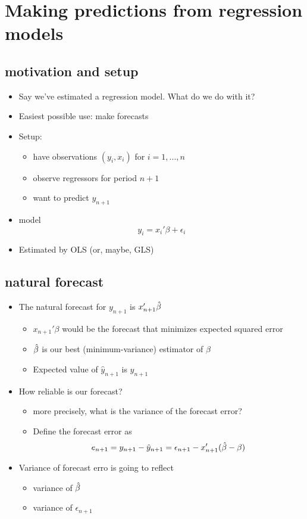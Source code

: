 \section{Making predictions from regression models}

\subsection{motivation and setup}
\begin{itemize}[leftmargin=0pt]
\item Say we've estimated a regression model.  What do we do with it?
\item Easiest possible use: make forecasts
\item Setup:
\begin{itemize}
\item have observations $(y_i, x_i)$ for $i = 1,...,n$
\item observe regressors for period $n+1$
\item want to predict $y_{n+1}$
\end{itemize}
\item model \[ y_i = x_i'\beta + \epsilon_i \]
\item Estimated by OLS (or, maybe, GLS)
\end{itemize}

\subsection{natural forecast}

\begin{itemize}[leftmargin=0pt]
\item The natural forecast for $y_{n+1}$ is $x_{n+1}'\hat{\beta}$
\begin{itemize}
\item $x_{n+1}'\beta$ would be the forecast that minimizes expected
         squared error
\item $\hat{\beta}$ is our best (minimum-variance) estimator of $\beta$
\item Expected value of $\hat y_{n+1}$ is $y_{n+1}$
\end{itemize}
\item How reliable is our forecast?
\begin{itemize}
\item more precisely, what is the variance of the forecast error?
\item Define the forecast error as 
  \[ e_{n+1} = y_{n+1} - \hat y_{n+1} = \epsilon_{n+1} - x_{n+1}'(\hat{\beta} - \beta) \]
\end{itemize}
\item Variance of forecast erro is going to reflect
\begin{itemize}
\item variance of $\hat{\beta}$
\item variance of $\epsilon_{n+1}$
\end{itemize}
\end{itemize}

